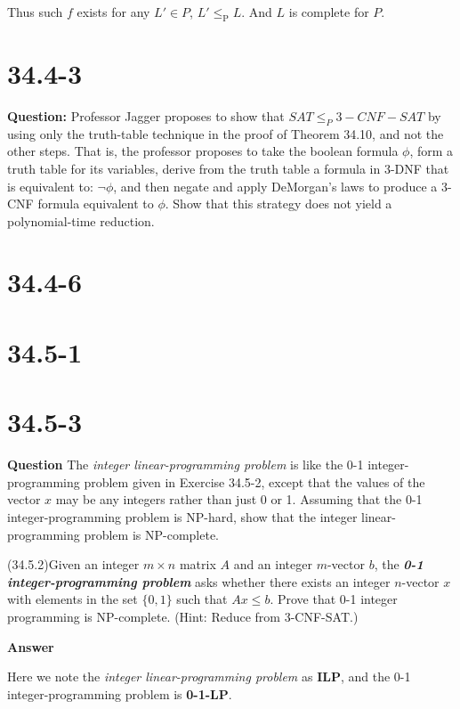 \documentclass[12pt]{article}
\begin{document}
Thus such $f$ exists for any $L' \in P$, $L' \le_\text{P} L$. And $L$ is complete for $P$.

\section{34.4-3}
\textbf{Question: }Professor Jagger proposes to show that \(SAT \leq_P 3-CNF-SAT \) by using only the truth-table technique in the proof of Theorem 34.10, and not the other steps. That is, the professor proposes to take the boolean formula \(\phi\), form a truth table for its variables, derive from the truth table a formula in 3-DNF that is equivalent
to: \(\lnot\phi\), and then negate and apply DeMorgan’s laws to produce a 3-CNF formula
equivalent to \(\phi\). Show that this strategy does not yield a polynomial-time reduction.

\section{34.4-6}

\section{34.5-1}

\section{34.5-3}
\textbf{Question}
The \textit{integer linear-programming problem} is like the 0-1 integer-programming problem given in Exercise 34.5-2, except that the values of the vector $x$ may be any integers rather than just 0 or 1. Assuming that the 0-1 integer-programming problem is NP-hard, show that the integer linear-programming problem is NP-complete.

(34.5.2)Given an integer $m \times n$ matrix $A$ and an integer $m$-vector $b$, the \textbf{\textit{0-1 integer-programming problem}} asks whether there exists an integer $n$-vector $x$ with elements in the set $\{0, 1\}$ such that $Ax \le b$. Prove that 0-1 integer programming is NP-complete. (Hint: Reduce from 3-CNF-SAT.)

\textbf{Answer}

Here we note the \textit{integer linear-programming problem} as \textbf{ILP}, and the 0-1 integer-programming problem is \textbf{0-1-LP}.
\end{document}
